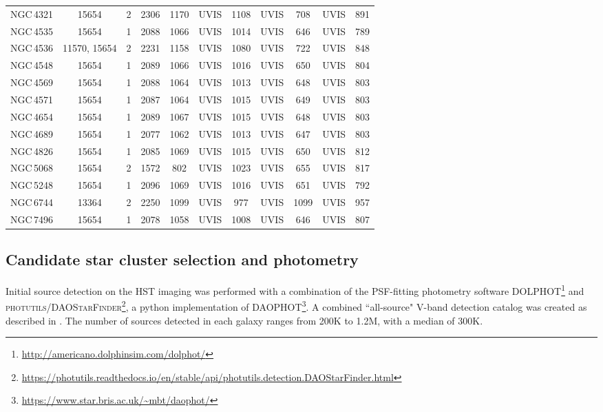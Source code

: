 \documentclass[linenumbers]{aastex63}
\begin{document}
\begin{table*}
\begin{center}
\begin{tabular}{lcccccccccc}
NGC\,4321 & 15654 & 2 & 2306 & 1170 & UVIS & 1108 & UVIS & 708 & UVIS & 891\\
NGC\,4535 & 15654 & 1 & 2088 & 1066 & UVIS & 1014 & UVIS & 646 & UVIS & 789\\
NGC\,4536 & 11570, 15654 & 2 & 2231 & 1158 & UVIS & 1080 & UVIS & 722 & UVIS & 848\\
NGC\,4548 & 15654 & 1 & 2089 & 1066 & UVIS & 1016 & UVIS & 650 & UVIS & 804\\
NGC\,4569 & 15654 & 1 & 2088 & 1064 & UVIS & 1013 & UVIS & 648 & UVIS & 803\\
NGC\,4571 & 15654 & 1 & 2087 & 1064 & UVIS & 1015 & UVIS & 649 & UVIS & 803\\
NGC\,4654 & 15654 & 1 & 2089 & 1067 & UVIS & 1015 & UVIS & 648 & UVIS & 803\\
NGC\,4689 & 15654 & 1 & 2077 & 1062 & UVIS & 1013 & UVIS & 647 & UVIS & 803\\
NGC\,4826 & 15654 & 1 & 2085 & 1069 & UVIS & 1015 & UVIS & 650 & UVIS & 812\\
NGC\,5068 & 15654 & 2 & 1572 & 802 & UVIS & 1023 & UVIS & 655 & UVIS & 817\\
NGC\,5248 & 15654 & 1 & 2096 & 1069 & UVIS & 1016 & UVIS & 651 & UVIS & 792\\
NGC\,6744 & 13364 & 2 & 2250 & 1099 & UVIS & 977 & UVIS & 1099 & UVIS & 957\\
NGC\,7496 & 15654 & 1 & 2078 & 1058 & UVIS & 1008 & UVIS & 646 & UVIS & 807\\
\hline
\hline
\end{tabular} 
\end{center}
\end{table*}
% 

\subsection{Candidate star cluster selection and photometry}\label{ssect:select_photo}

Initial source detection \citep{thilker_phangs-hst_2022} on the HST imaging was performed with a combination of the PSF-fitting photometry software \textsc{DOLPHOT}\footnote{\url{http://americano.dolphinsim.com/dolphot/}} \citep[v2.0,][]{dolphin_dolphot_2016} and \textsc{photutils/DAOStarFinder}\footnote{\url{https://photutils.readthedocs.io/en/stable/api/photutils.detection.DAOStarFinder.html}}\citep[][]{bradley_astropyphotutils_2023}, a python implementation of \textsc{DAOPHOT}\footnote{\url{https://www.star.bris.ac.uk/~mbt/daophot/}}\citep[v1.3-2][]{stetson_daophot_1987}. A combined ``all-source" V-band detection catalog was created as described in \citet{thilker_phangs-hst_2022}. The number of sources detected in each galaxy ranges from 200K to 1.2M, with a median of 300K.
\end{document}
